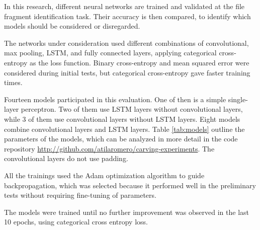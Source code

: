 In this research, different neural networks are trained and validated
at the file fragment identification task. Their accuracy is then compared,
to identify which models should be considered or disregarded.

The networks under consideration used different combinations of convolutional, max pooling, LSTM, and fully connected layers,
applying categorical cross-entropy as the loss function. Binary cross-entropy and mean squared error were considered during initial tests, but categorical cross-entropy gave faster training times.

Fourteen models participated in this evaluation. One of then is a simple single-layer perceptron. Two of them use LSTM layers without convolutional layers, while 3 of them use convolutional layers without LSTM layers. Eight models combine convolutional layers and LSTM layers. Table \ref{tab:models} outline the parameters of the models, which can be analyzed in more detail in the code repository \sloppy\url{http://github.com/atilaromero/carving-experiments}. The convolutional layers do not use padding. 



All the trainings used the Adam \cite{kingma_adam:_2014}
optimization algorithm to guide backpropagation, which was selected because it performed well in the preliminary tests without requiring fine-tuning of parameters.

The models were trained until no further improvement was observed in the last 10 epochs, using categorical cross entropy loss.

